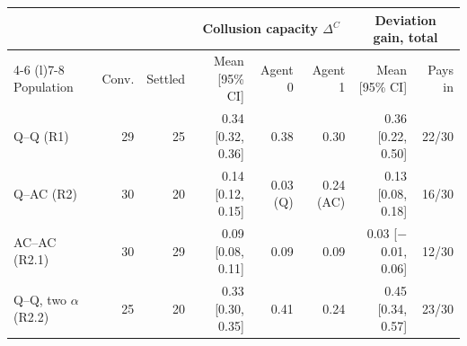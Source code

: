 \begin{tabular}{@{}lrrrrrrr@{}}
\toprule
 &  &  & \multicolumn{3}{c}{Collusion capacity $\Delta^C$} & \multicolumn{2}{c}{Deviation gain, total} \\
\cmidrule(lr){4-6} \cmidrule(l){7-8}
Population & Conv. & Settled & Mean [95\% CI] & Agent 0 & Agent 1 & Mean [95\% CI] & Pays in \\
\midrule
Q–Q (R1) & 29 & 25 & 0.34 [0.32, 0.36] & 0.38 & 0.30 & 0.36 [0.22, 0.50] & 22/30 \\
Q–AC (R2) & 30 & 20 & 0.14 [0.12, 0.15] & 0.03 (Q) & 0.24 (AC) & 0.13 [0.08, 0.18] & 16/30 \\
AC–AC (R2.1) & 30 & 29 & 0.09 [0.08, 0.11] & 0.09 & 0.09 & 0.03 [$-$0.01, 0.06] & 12/30 \\
Q–Q, two $\alpha$ (R2.2) & 25 & 20 & 0.33 [0.30, 0.35] & 0.41 & 0.24 & 0.45 [0.34, 0.57] & 23/30 \\
\bottomrule
\end{tabular}
